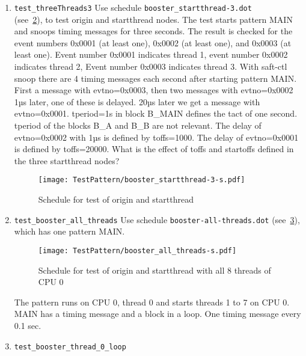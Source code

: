 \documentclass[12pt,a4paper]{report}
\begin{document}
\begin{enumerate}
    \begin{figure}
        \centering
        \texttt{[image: TestPattern/booster\_startthread-2-s.pdf]}
        \caption{Schedule for test of origin with thread 1}
        \label{fig:Schedule_booster_startthread-2}
    \end{figure}
\item \texttt{test\_threeThreads3}
Use schedule \texttt{booster\_startthread-3.dot} \\
(see~\ref{fig:Schedule_booster_startthread-3}),
to test origin and startthread nodes. The test starts pattern MAIN and snoops timing messages
for three seconds. The result is checked for the event numbers
0x0001 (at least one), 0x0002 (at least one), and 0x0003 (at least one).
Event number 0x0001 indicates thread 1, event number 0x0002 indicates thread 2, Event number 0x0003 indicates thread 3.
With saft-ctl snoop there are 4 timing messages each second after starting pattern MAIN.
First a message with evtno=0x0003, then two messages with evtno=0x0002 1µs later, one of these is delayed.
20µs later we get a message with evtno=0x0001.
tperiod=1s in block B\_MAIN defines the tact of one second. tperiod of the blocks B\_A and B\_B are not relevant.
The delay of evtno=0x0002 with 1µs is defined by toffs=1000. The delay of evtno=0x0001 is defined by toffs=20000.
What is the effect of toffs and startoffs defined in the three startthread nodes?
    \begin{figure}
        \centering
        \texttt{[image: TestPattern/booster\_startthread-3-s.pdf]}
        \caption{Schedule for test of origin and startthread}
        \label{fig:Schedule_booster_startthread-3}
    \end{figure}
\item \texttt{test\_booster\_all\_threads}
Use schedule \texttt{booster-all-threads.dot} (see~\ref{fig:Schedule_booster_all_threads}),
which has one pattern MAIN.
    \begin{figure}
        \centering
        \texttt{[image: TestPattern/booster\_all\_threads-s.pdf]}
        \caption{Schedule for test of origin and startthread with all 8 threads of CPU 0}
        \label{fig:Schedule_booster_all_threads}
    \end{figure}
The pattern runs on CPU 0, thread 0 and starts threads 1 to 7 on CPU 0.
MAIN has a timing message and a block in a loop. One timing message every 0.1 sec.
\item \texttt{test\_booster\_thread\_0\_loop}

\end{enumerate}
\end{document}
